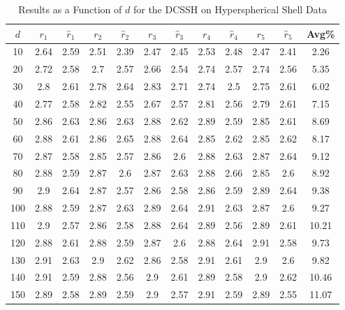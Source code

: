 \documentclass[11pt,twoside]{report}
\theoremstyle{definition}
\numberwithin{theorem}{section}
\numberwithin{definition}{section}
\numberwithin{lemma}{section}
\numberwithin{proposition}{section}
\numberwithin{equation}{section}
\numberwithin{figure}{section}
\begin{document}
\begin{appendices}
    \begin{table}[ht]
        \centering
        \begin{tabular}{|c||cc||cc||cc||cc||cc||c|} \hline
            $d$&$r_1$&$\hat{r}_1$&$r_2$&$\hat{r}_2$&$r_3$&$\hat{r}_3$&$r_4$&$\hat{r}_4$&$r_5$&$\hat{r}_5$&Avg\% \\ \hline
            10&2.64&2.59&2.51&2.39&2.47&2.45&2.53&2.48&2.47&2.41&2.26 \\
            20&2.72&2.58&2.7&2.57&2.66&2.54&2.74&2.57&2.74&2.56&5.35 \\
            30&2.8&2.61&2.78&2.64&2.83&2.71&2.74&2.5&2.75&2.61&6.02 \\
            40&2.77&2.58&2.82&2.55&2.67&2.57&2.81&2.56&2.79&2.61&7.15 \\
            50&2.86&2.63&2.86&2.63&2.88&2.62&2.89&2.59&2.85&2.61&8.69 \\
            60&2.88&2.61&2.86&2.65&2.88&2.64&2.85&2.62&2.85&2.62&8.17 \\
            70&2.87&2.58&2.85&2.57&2.86&2.6&2.88&2.63&2.87&2.64&9.12 \\
            80&2.88&2.59&2.87&2.6&2.87&2.63&2.88&2.66&2.85&2.6&8.92 \\
            90&2.9&2.64&2.87&2.57&2.86&2.58&2.86&2.59&2.89&2.64&9.38 \\
            100&2.88&2.59&2.87&2.63&2.89&2.64&2.91&2.63&2.87&2.6&9.27 \\
            110&2.9&2.57&2.86&2.58&2.88&2.64&2.89&2.56&2.89&2.61&10.21 \\
            120&2.88&2.61&2.88&2.59&2.87&2.6&2.88&2.64&2.91&2.58&9.73 \\
            130&2.91&2.63&2.9&2.62&2.86&2.58&2.91&2.61&2.9&2.6&9.82 \\
            140&2.91&2.59&2.88&2.56&2.9&2.61&2.89&2.58&2.9&2.62&10.46 \\
            150&2.89&2.58&2.89&2.59&2.9&2.57&2.91&2.59&2.89&2.55&11.07 \\ \hline
        \end{tabular}
        \caption{Results as a Function of $d$ for the DCSSH on Hyperspherical Shell Data}
        \label{tab:hyperspherical_shell_dcssh_table_d}
    \end{table}
    \clearpage
    
    

\end{appendices}
\end{document}
